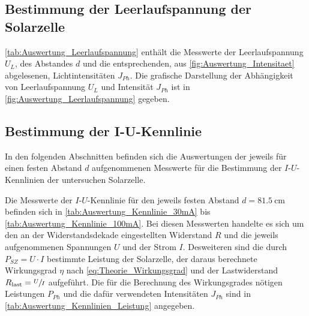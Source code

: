 	
\subsection{Bestimmung der Leerlaufspannung der Solarzelle}
	
	\cref{tab:Auswertung_Leerlaufspannung} enthält die Messwerte der Leerlaufspannung $ U_{L} $,
	des Abstandes $ d $ und die entsprechenden, aus \cref{fig:Auswertung_Intensitaet} abgelesenen,
	Lichtintensitäten $ J_{Ph} $. Die grafische Darstellung der Abhängigkeit von Leerlaufspannung $ U_{L} $
	und Intensität $ J_{Ph} $ ist in \cref{fig:Auswertung_Leerlaufspannung} gegeben.


%	
	
	
\subsection{Bestimmung der I-U-Kennlinie}
	In den folgenden Abschnitten befinden sich die Auswertungen der jeweils für
	einen festen Abstand $d$ aufgenommenen Messwerte für die Bestimmung der $I \text{-}U$-Kennlinien
	der untersuchen Solarzelle.  
	
	Die Messwerte der $I\text{-}U$-Kennlinie für den jeweils festen Abstand $d = \SI{81.5}{\cm}$
	befinden sich in \cref{tab:Auswertung_Kennlinie_30mA} bis \ref{tab:Auswertung_Kennlinie_100mA}.
    Bei diesen Messwerten handelte es
	sich um den an der Widerstandsdekade eingestellten Widerstand $R$ und die jeweils aufgenommenen 
	Spannungen $U$ und der Strom $I$. Desweiteren sind die durch $P_{SZ} = U \cdot I$ bestimmte
	Leistung der Solarzelle, der daraus berechnete Wirkungsgrad $\eta$ nach \cref{eq:Theorie_Wirkungsgrad} 
	und der Lastwiderstand $R_{\text{last}} = \sfrac{U}{I}$ aufgeführt.
	Die für die Berechnung des Wirkungsgrades nötigen Leistungen $P_{Ph}$ und die dafür verwendeten 
	Intensitäten $J_{Ph}$ sind in \cref{tab:Auswertung_Kennlinien_Leistung} angegeben.   
	

		
 

